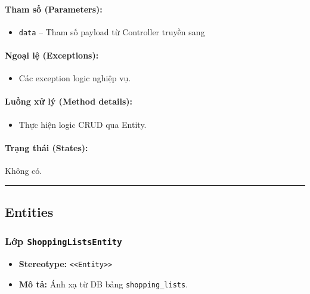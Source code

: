 \documentclass[12pt,a4paper]{article}
\begin{document}
\paragraph{Tham số (Parameters):}
\begin{itemize}[leftmargin=*]
    \item \texttt{data} – Tham số payload từ Controller truyền sang
\end{itemize}


\paragraph{Ngoại lệ (Exceptions):}
\begin{itemize}[leftmargin=*]
    \item Các exception logic nghiệp vụ.
\end{itemize}


\paragraph{Luồng xử lý (Method details):}
\begin{itemize}[leftmargin=*]
    \item Thực hiện logic CRUD qua Entity.
\end{itemize}


\paragraph{Trạng thái (States):}
Không có.

\vskip 0.5cm
\noindent\rule{\textwidth}{0.5pt}
\vskip 0.5cm

\subsection{Entities}


\subsubsection{Lớp \texttt{ShoppingListsEntity}}

\begin{itemize}[leftmargin=*]
    \item \textbf{Stereotype:} \texttt{\textless{}\textless{}Entity\textgreater{}\textgreater{}}
    \item \textbf{Mô tả:} Ánh xạ từ DB bảng \texttt{shopping\_lists}.
\end{itemize}
\end{document}
